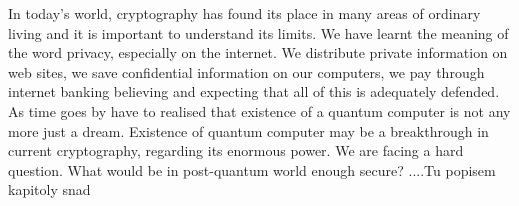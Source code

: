 In today's world, cryptography has found its place in many areas of ordinary living and it is important to understand its limits. We have learnt the meaning of the word privacy, especially on the internet. We distribute private information on web sites, we save confidential information on our computers, we pay through internet banking believing and expecting that all of this is adequately defended. As time goes by have to realised that existence of a quantum computer is not any more just a dream. Existence of quantum computer may be a breakthrough in current cryptography, regarding its enormous power. We are facing a hard question. What would be in post-quantum world enough secure?
....Tu popisem kapitoly snad
